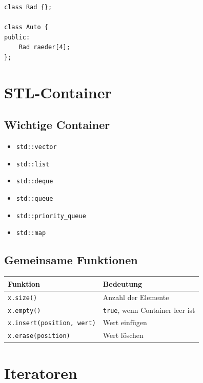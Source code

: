 \documentclass[11pt,a4paper]{article}
\newcommand{\code}[1]{\texttt{#1}}
\begin{document}
\begin{lstlisting}[caption={Komposition}]
class Rad {};

class Auto {
public:
    Rad raeder[4];
};
\end{lstlisting}

\section{STL-Container}

\subsection{Wichtige Container}
\begin{itemize}
  \item \code{std::vector}
  \item \code{std::list}
  \item \code{std::deque}
  \item \code{std::queue}
  \item \code{std::priority\_queue}
  \item \code{std::map}
\end{itemize}

\subsection{Gemeinsame Funktionen}
\begin{center}
\begin{tabular}{ll}
\toprule
Funktion & Bedeutung \\
\midrule
\code{x.size()} & Anzahl der Elemente \\
\code{x.empty()} & \code{true}, wenn Container leer ist \\
\code{x.insert(position, wert)} & Wert einfügen \\
\code{x.erase(position)} & Wert löschen \\
\bottomrule
\end{tabular}
\end{center}

\section{Iteratoren}
\end{document}
